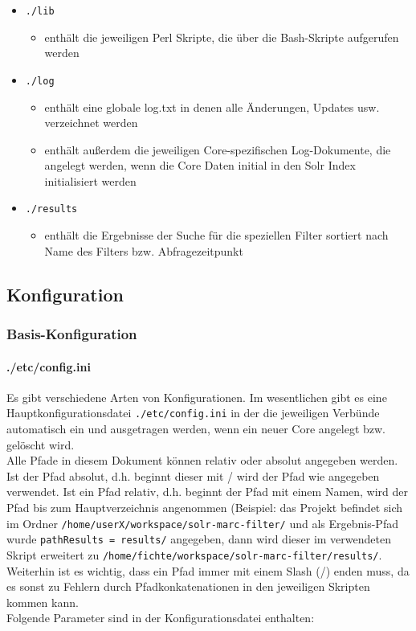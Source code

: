 \documentclass[10pt]{article}
\begin{document}
\begin{itemize}
	\item[] \texttt{./lib}
	\begin{itemize}
		\item enthält die jeweiligen Perl Skripte, die über die Bash-Skripte aufgerufen werden
	\end{itemize}

	\item[] \texttt{./log}
	\begin{itemize}
		\item enthält eine globale log.txt in denen alle Änderungen, Updates usw. verzeichnet werden
		\item enthält außerdem die jeweiligen Core-spezifischen Log-Dokumente, die angelegt werden, wenn die Core Daten initial in den Solr Index initialisiert werden
	\end{itemize}

	\item[] \texttt{./results}
	\begin{itemize}
		\item enthält die Ergebnisse der Suche für die speziellen Filter sortiert nach Name des Filters bzw. Abfragezeitpunkt
	\end{itemize}

\end{itemize}


\subsection{Konfiguration}
\subsubsection{Basis-Konfiguration}
\paragraph{./etc/config.ini}
\label{sec:para:config.ini}
Es gibt verschiedene Arten von Konfigurationen. Im wesentlichen gibt es eine Hauptkonfigurationsdatei \texttt{./etc/config.ini} in der die jeweiligen Verbünde automatisch ein und ausgetragen werden, wenn ein neuer Core angelegt bzw. gelöscht wird. \\
Alle Pfade in diesem Dokument können relativ oder absolut angegeben werden. Ist der Pfad absolut, d.h. beginnt dieser mit / wird der Pfad wie angegeben verwendet. Ist ein Pfad relativ, d.h. beginnt der Pfad mit einem Namen, wird der Pfad bis zum Hauptverzeichnis angenommen (Beispiel: das Projekt befindet sich im Ordner \texttt{/home/userX/workspace/solr-marc-filter/} und als Ergebnis-Pfad wurde \texttt{pathResults = results/} angegeben, dann wird dieser im verwendeten Skript erweitert zu \texttt{/home/fichte/workspace/solr-marc-filter/results/}. \\
Weiterhin ist es wichtig, dass ein Pfad immer mit einem Slash (/) enden muss, da es sonst zu Fehlern durch Pfadkonkatenationen in den jeweiligen Skripten kommen kann. \\
Folgende Parameter sind in der Konfigurationsdatei enthalten:
\end{document}

